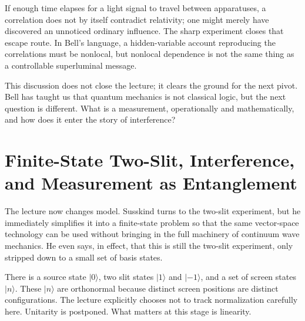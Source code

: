 If enough time elapses for a light signal to travel between apparatuses, a correlation does not by itself contradict relativity; one might merely have discovered an unnoticed ordinary influence. The sharp experiment closes that escape route. In Bell's language, a hidden-variable account reproducing the correlations must be nonlocal, but nonlocal dependence is not the same thing as a controllable superluminal message.

\begin{classroomqa}
\end{classroomqa}

This discussion does not close the lecture; it clears the ground for the next pivot. Bell has taught us that quantum mechanics is not classical logic, but the next question is different. What is a measurement, operationally and mathematically, and how does it enter the story of interference?

\section{Finite-State Two-Slit, Interference, and Measurement as Entanglement}

The lecture now changes model. Susskind turns to the two-slit experiment, but he immediately simplifies it into a finite-state problem so that the same vector-space technology can be used without bringing in the full machinery of continuum wave mechanics. He even says, in effect, that this is still the two-slit experiment, only stripped down to a small set of basis states.

There is a source state \(|0\rangle\), two slit states \(|1\rangle\) and \(|-1\rangle\), and a set of screen states \(|n\rangle\). These \(|n\rangle\) are orthonormal because distinct screen positions are distinct configurations. The lecture explicitly chooses not to track normalization carefully here. Unitarity is postponed. What matters at this stage is linearity.

